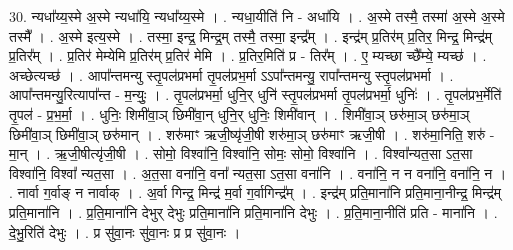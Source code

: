 \documentclass[17pt]{extarticle}
\begin{document}
30. न्यधा᳚य्य॒स्मे अ॒स्मे न्यधा॑यि॒ न्यधा᳚य्य॒स्मे । . न्यधा॒यीति॑ नि - अधा॑यि । . अ॒स्मे तस्मै॒ तस्मा॑ अ॒स्मे अ॒स्मे तस्मै᳚ । . अ॒स्मे इत्य॒स्मे । . तस्मा॒ इन्द्र॒ मिन्द्र॒म् तस्मै॒ तस्मा॒ इन्द्र᳚म् । . इन्द्र॑म् प्र॒तिर॑म् प्र॒तिर॒ मिन्द्र॒ मिन्द्र॑म् प्र॒तिर᳚म् । . प्र॒तिर॑ मेम्येमि प्र॒तिर॑म् प्र॒तिर॑ मेमि । . प्र॒तिर॒मिति॑ प्र - तिर᳚म् । . ए॒ म्यच्छा च्छै᳚म्ये॒ म्यच्छ॑ । . अच्छेत्यच्छ॑ । . आपा᳚न्तमन्यु स्तृ॒पल॑प्रभर्मा तृ॒पल॑प्रभ॒र्मा ऽऽपा᳚न्तमन्यु॒ रापा᳚न्तमन्यु स्तृ॒पल॑प्रभर्मा । . आपा᳚न्तमन्यु॒रित्यापा᳚न्त - म॒न्युः॒ । . तृ॒पल॑प्रभर्मा॒ धुनि॒र् धुनि॑ स्तृ॒पल॑प्रभर्मा तृ॒पल॑प्रभर्मा॒ धुनिः॑ । . तृ॒पल॑प्रभ॒र्मेति॑ तृ॒पल॑ - प्र॒भ॒र्मा॒ । . धुनिः॒ शिमी॑वा॒ञ् छिमी॑वा॒न् धुनि॒र् धुनिः॒ शिमी॑वान् । . शिमी॑वा॒ञ् छरु॑मा॒ञ् छरु॑मा॒ञ् छिमी॑वा॒ञ् छिमी॑वा॒ञ् छरु॑मान् । . शरु॑माꣳ ऋजी॒ष्यृ॑जी॒षी शरु॑मा॒ञ् छरु॑माꣳ ऋजी॒षी । . शरु॑मा॒निति॒ शरु॑ - मा॒न् । . ऋ॒जी॒षीत्यृ॑जी॒षी । . सोमो॒ विश्वा॑नि॒ विश्वा॑नि॒ सोमः॒ सोमो॒ विश्वा॑नि । . विश्वा᳚न्यत॒सा ऽत॒सा विश्वा॑नि॒ विश्वा᳚ न्यत॒सा । . अ॒त॒सा वना॑नि॒ वना᳚ न्यत॒सा ऽत॒सा वना॑नि । . वना॑नि॒ न न वना॑नि॒ वना॑नि॒ न । . नार्वा ग॒र्वाङ् न नार्वाक् । . अ॒र्वा गिन्द्र॒ मिन्द्र॑ म॒र्वा ग॒र्वागिन्द्र᳚म् । . इन्द्र॑म् प्रति॒माना॑नि प्रति॒माना॒नीन्द्र॒ मिन्द्र॑म् प्रति॒माना॑नि । . प्र॒ति॒माना॑नि देभुर् देभुः प्रति॒माना॑नि प्रति॒माना॑नि देभुः । . प्र॒ति॒माना॒नीति॑ प्रति - माना॑नि । . दे॒भु॒रिति॑ देभुः । . प्र सु॑वा॒नः सु॑वा॒नः प्र प्र सु॑वा॒नः । \newline
\end{document}
